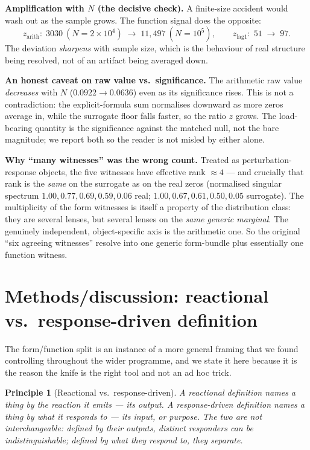 \documentclass[11pt]{article}
\newtheorem{principle}{Principle}
\begin{document}
\textbf{Amplification with $N$ (the decisive check).} A finite-size accident would wash out as the sample grows. The function signal does the opposite:
\[
z_{\mathrm{arith}}:\;3030\ (N{=}2{\times}10^4)\;\to\;11{,}497\ (N{=}10^5),
\qquad
z_{\mathrm{lag1}}:\;51\;\to\;97.
\]
The deviation \emph{sharpens} with sample size, which is the behaviour of real structure being resolved, not of an artifact being averaged down.

\textbf{An honest caveat on raw value vs.\ significance.} The arithmetic raw value \emph{decreases} with $N$ ($0.0922\to0.0636$) even as its significance rises. This is not a contradiction: the explicit-formula sum normalises downward as more zeros average in, while the surrogate floor falls faster, so the ratio $z$ grows. The load-bearing quantity is the significance against the matched null, not the bare magnitude; we report both so the reader is not misled by either alone.

\textbf{Why ``many witnesses'' was the wrong count.} Treated as perturbation-response objects, the five witnesses have effective rank $\approx4$ --- and crucially that rank is the \emph{same} on the surrogate as on the real zeros (normalised singular spectrum $1.00,0.77,0.69,0.59,0.06$ real; $1.00,0.67,0.61,0.50,0.05$ surrogate). The multiplicity of the form witnesses is itself a property of the distribution class: they are several lenses, but several lenses on the \emph{same generic marginal}. The genuinely independent, object-specific axis is the arithmetic one. So the original ``six agreeing witnesses'' resolve into one generic form-bundle plus essentially one function witness.

\section{Methods/discussion: reactional vs.\ response-driven definition}\label{sec:epistemology}

The form/function split is an instance of a more general framing that we found controlling throughout the wider programme, and we state it here because it is the reason the knife is the right tool and not an ad hoc trick.

\begin{principle}[Reactional vs.\ response-driven]
A \emph{reactional} definition names a thing by the reaction it emits --- its output. A \emph{response-driven} definition names a thing by what it responds to --- its input, or purpose. The two are not interchangeable: defined by their outputs, distinct responders can be indistinguishable; defined by what they respond to, they separate.
\end{principle}
\end{document}
